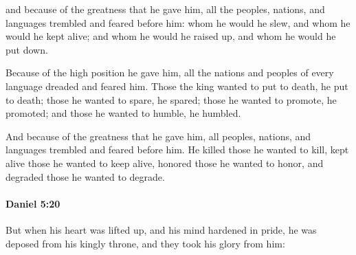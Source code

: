 			\begin{versebox}
					\item[BHS] 
					\item[ASV] and because of the greatness that he gave him, all the peoples, nations, and languages trembled and feared before him: whom he would he slew, and whom he would he kept alive; and whom he would he raised up, and whom he would he put down.
					\item[NIV] Because of the high position he gave him, all the nations and peoples of every language dreaded and feared him. Those the king wanted to put to death, he put to death; those he wanted to spare, he spared; those he wanted to promote, he promoted; and those he wanted to humble, he humbled.
					\item[NRSV] And because of the greatness that he gave him, all peoples, nations, and languages trembled and feared before him. He killed those he wanted to kill, kept alive those he wanted to keep alive, honored those he wanted to honor, and degraded those he wanted to degrade.
			\end{versebox}

		\paragraph{Daniel 5:20} %
			\label{DANIEL-5-20}

			But when his heart was lifted up, and his mind hardened in pride, he was deposed from his kingly throne, and they took his glory from him:


